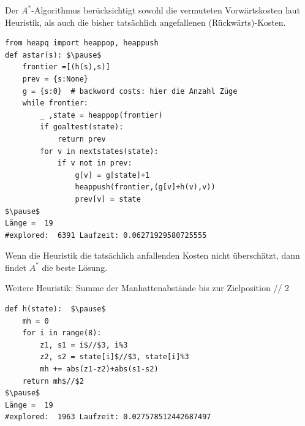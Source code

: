 \begin{frame}[fragile]
Der $A^{*}$-Algorithmus berücksichtigt sowohl die vermuteten Vorwärtskosten laut Heuristik, als auch die bisher
tatsächlich angefallenen (Rückwärts)-Kosten.
\begin{lstlisting} 
from heapq import heappop, heappush
def astar(s): $\pause$
    frontier =[(h(s),s)]  
    prev = {s:None}
    g = {s:0}  # backword costs: hier die Anzahl Züge
    while frontier:
        _ ,state = heappop(frontier)  
        if goaltest(state):
            return prev
        for v in nextstates(state):
            if v not in prev:
                g[v] = g[state]+1
                heappush(frontier,(g[v]+h(v),v))
                prev[v] = state
$\pause$
Länge =  19
#explored:  6391 Laufzeit: 0.06271929580725555
\end{lstlisting} 
\end{frame}
\begin{frame}[fragile]
Wenn die Heuristik die tatsächlich anfallenden Kosten nicht überschätzt, dann findet $A^{*}$ die beste Lösung.

Weitere Heuristik: \pause Summe der Manhattenabstände bis zur Zielposition // 2

\begin{lstlisting} 
def h(state):  $\pause$
    mh = 0
    for i in range(8):
        z1, s1 = i$//$3, i%3
        z2, s2 = state[i]$//$3, state[i]%3
        mh += abs(z1-z2)+abs(s1-s2)
    return mh$//$2
$\pause$
Länge =  19
#explored:  1963 Laufzeit: 0.027578512442687497
\end{lstlisting} 
\end{frame}
 